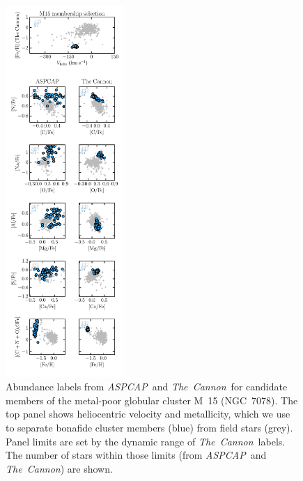 \documentclass[12pt,preprint]{aastex}
\newcommand{\project}[1]{\textsl{#1}}
\newcommand{\TheCannon}{\project{The~Cannon}}
\newcommand{\acronym}[1]{{\small{#1}}}
\newcommand{\aspcap}{\project{\acronym{ASPCAP}}}
\begin{document}
\clearpage



\begin{figure}[p]
\centering
\includegraphics[width=0.40\textwidth]{M15_comparison.pdf}
\caption{Abundance labels from \aspcap\ and \TheCannon\ for candidate
members of the metal-poor globular cluster M~15 (NGC~7078).  The top panel
shows heliocentric velocity and metallicity, which we use to separate
bonafide cluster members (blue) from field stars (grey). Panel limits
are set by the dynamic range of \TheCannon\ labels.  The number of stars
within those limits (from \aspcap\ and \TheCannon) are shown.\label{fig:m15-comparison}}
\end{figure}

\clearpage
\end{document}
